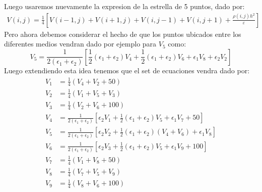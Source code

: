 \documentclass[
  11pt,
  letterpaper,
   addpoints,
   answers
  ]{exam}
\begin{document}
\begin{questions}
\begin{solution}
\begin{enumerate}
\begin{center}
        \end{center}
        

        Luego usaremos nuevamente la expresion de la estrella de 5 puntos, dado por:
        \begin{align}
            V(i,j) = \frac{1}{4} \left[ V(i-1,j) + V(i+1,j) + V(i,j-1) + V(i,j+1) + \frac{\rho(i,j)h^2}{\varepsilon} \right]
        \end{align}
        Pero ahora debemos considerar el hecho de que los puntos ubicados entre los diferentes medios vendran dado por ejemplo para $V_{5} $ como:
        \begin{equation}
            V_{5} = \frac{1}{2(\epsilon_{1}+\epsilon_{2})} \left[ \frac{1}{2}(\epsilon_{1}+\epsilon_{2}) V_{4} +  \frac{1}{2}(\epsilon_{1}+\epsilon_{2}) V_{6} + \epsilon_{1}V_{8} + \epsilon_{2} V_{2} \right]
        \end{equation}
        Luego extendiendo esta idea tenemos que el set de ecuaciones vendra dado por:
        \begin{align}
            V_1 &= \frac{1}{4} \left( V_4 + V_2 + 50 \right) \\
            V_2 &= \frac{1}{4} \left( V_1 + V_5 + V_3 \right) \\
            V_3 &= \frac{1}{4} \left( V_2 + V_6 + 100 \right) \\
            V_4 &= \frac{1}{2(\epsilon_1 + \epsilon_2)} \left[ \epsilon_2 V_1 + \frac{1}{2} (\epsilon_1 + \epsilon_2) V_5 + \epsilon_1 V_7 + 50 \right] \\
            V_5 &= \frac{1}{2 (\epsilon_1 + \epsilon_2)} \left[ \epsilon_2 V_2 + \frac{1}{2} (\epsilon_1 + \epsilon_2) (V_4 + V_6) + \epsilon_1 V_8 \right] \\
            V_6 &= \frac{1}{2 (\epsilon_1 + \epsilon_2)} \left[ \epsilon_2 V_3 + \frac{1}{2} (\epsilon_1 + \epsilon_2) V_5 + \epsilon_1 V_9 + 100 \right] \\
            V_7 &= \frac{1}{4} \left( V_1 + V_8 + 50 \right) \\
            V_8 &= \frac{1}{4} \left( V_7 + V_5 + V_9 \right) \\
            V_9 &= \frac{1}{4} \left( V_8 + V_6 + 100 \right)

\end{align}
\end{enumerate}
\end{solution}
\end{questions}
\end{document}
